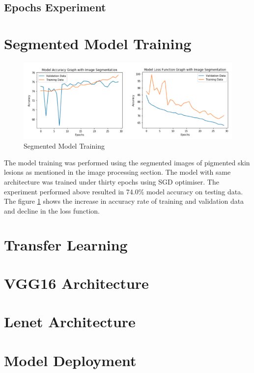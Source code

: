 \subsection{Epochs Experiment}


\section{Segmented Model Training}
\begin{figure}[!htp]
    \centering
    \includegraphics[width=\textwidth]{Images/segmented.png}
    \caption{Segmented Model Training}
    \label{fig:segmodel}
\end{figure}
The model training was performed using the segmented images of pigmented skin lesions as mentioned in the 
image processing section. The model with same architecture was trained under thirty epochs using SGD optimiser. The experiment performed above resulted in 74.0\% model 
accuracy on testing data. The figure \ref{fig:segmodel} shows the increase in accuracy rate of training and 
validation data and decline in the loss function.

\pagebreak
\section{Transfer Learning}

\pagebreak
\section{VGG16 Architecture}

\pagebreak
\section{Lenet Architecture}

\pagebreak
\section{Model Deployment}
